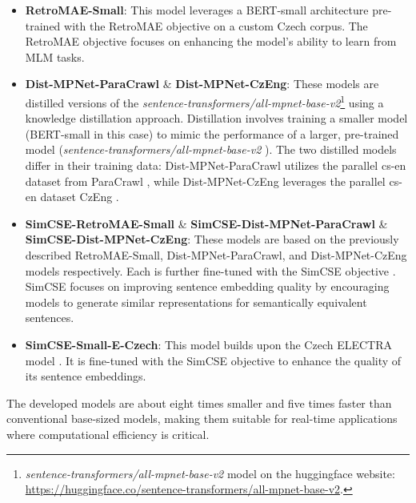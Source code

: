 \begin{itemize}
  \item \textbf{RetroMAE-Small}:
 This model leverages a \ac{BERT}-small architecture pre-trained with the \ac{RetroMAE} objective \cite{xiao2022retromae} on a custom Czech corpus.
 The \ac{RetroMAE} objective focuses on enhancing the model's ability to learn from \ac{MLM} tasks.
  \item \textbf{Dist-MPNet-ParaCrawl} \& \textbf{Dist-MPNet-CzEng}:
 These models are distilled versions of the \textit{sentence-transformers/all-mpnet-base-v2}\footnote{\label{hf_all-mpnet-base-v2}\textit{sentence-transformers/all-mpnet-base-v2} model on the huggingface website: \url{https://huggingface.co/sentence-transformers/all-mpnet-base-v2}.} using a knowledge distillation approach.
 Distillation \cite{sanh2020distilbert} involves training a smaller model (\ac{BERT}-small in this case) to mimic the performance of a larger, pre-trained model (\textit{sentence-transformers/all-mpnet-base-v2} ).
 The two distilled models differ in their training data: Dist-MPNet-ParaCrawl utilizes the parallel cs-en dataset from ParaCrawl \cite{espla2019paracrawl}, while Dist-MPNet-CzEng leverages the parallel cs-en dataset CzEng \cite{kocmi2020announcing}.
  \item \textbf{SimCSE-RetroMAE-Small} \& \textbf{SimCSE-Dist-MPNet-ParaCrawl} \& \textbf{SimCSE-Dist-MPNet-CzEng}:
 These models are based on the previously described RetroMAE-Small, Dist-MPNet-ParaCrawl, and Dist-MPNet-CzEng models respectively.
 Each is further fine-tuned with the \ac{SimCSE} objective \cite{gao2022simcse}.
 \ac{SimCSE} focuses on improving sentence embedding quality by encouraging models to generate similar representations for semantically equivalent sentences.
  \item \textbf{SimCSE-Small-E-Czech}:
 This model builds upon the Czech ELECTRA model \cite{kocián2021siamese}.
 It is fine-tuned with the \ac{SimCSE} \cite{gao2022simcse} objective to enhance the quality of its sentence embeddings.    
\end{itemize}

The developed models are about eight times smaller and five times faster than conventional base-sized models, making them suitable for real-time applications where computational efficiency is critical.

